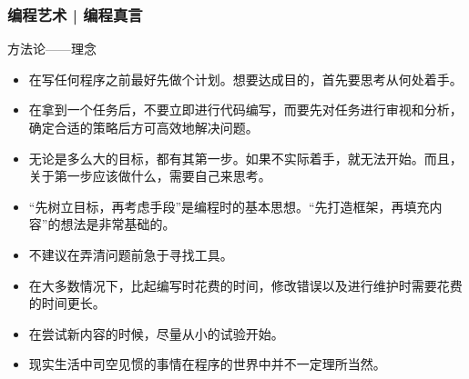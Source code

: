 \begin{frame}
  \frametitle{编程艺术 | 编程真言}
  \begin{block}{方法论——理念}
    \begin{itemize}
      \item 在写任何程序之前最好先做个\alert{计划}。想要达成目的，首先要思考从何处着手。
      \item 在拿到一个任务后，不要立即进行代码编写，而要先对任务进行\alert{审视和分析}，确定合适的策略后方可高效地解决问题。
      \item 无论是多么大的目标，都有其第一步。如果不实际着手，就无法开始。而且，关于第一步应该做什么，需要自己来思考。
      \item “先树立目标，再考虑手段”是编程时的基本思想。“先打造框架，再填充内容”的想法是非常基础的。
      \item 不建议在弄清问题前急于寻找工具。
      \item 在大多数情况下，比起编写时花费的时间，\alert{修改错误以及进行维护时需要花费的时间更长}。
    \item 在尝试新内容的时候，尽量从\alert{小的试验}开始。
      \item 现实生活中司空见惯的事情在程序的世界中并不一定理所当然。
    \end{itemize}
  \end{block}
\end{frame}

